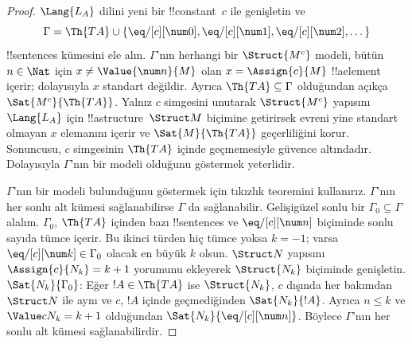 \documentclass[../../../include/open-logic-section]{subfiles}
\begin{document}
\begin{proof}
$\Lang{L_A}$ dilini yeni bir !!{constant}~$c$ ile genişletin ve
\[
\Gamma=\Th{TA}\cup\{\eq/[c][\num0],\eq/[c][\num1],
\eq/[c][\num2],\dots\}
\]
!!{sentence}s kümesini ele alın. $\Gamma$'nın herhangi bir
$\Struct{M^c}$ modeli, bütün $n\in\Nat$ için
$x\neq\Value{\num n}{M}$ olan $x=\Assign{c}{M}$ !!a{element}
içerir; dolayısıyla $x$ standart değildir. Ayrıca
$\Th{TA}\subseteq\Gamma$ olduğundan açıkça
$\Sat{M^c}{\Th{TA}}$. Yalnız $c$ simgesini unutarak $\Struct{M^c}$
yapısını $\Lang{L_A}$ için !!a{structure}~$\Struct M$ biçimine
getirirsek evreni yine standart olmayan $x$ elemanını içerir ve
$\Sat{M}{\Th{TA}}$ geçerliliğini korur. Sonuncusu, $c$ simgesinin
$\Th{TA}$ içinde geçmemesiyle güvence altındadır. Dolayısıyla
$\Gamma$'nın bir modeli olduğunu göstermek yeterlidir.

$\Gamma$'nın bir modeli bulunduğunu göstermek için tıkızlık teoremini
kullanırız. $\Gamma$'nın her sonlu alt kümesi sağlanabilirse $\Gamma$
da sağlanabilir. Gelişigüzel sonlu bir $\Gamma_0\subseteq\Gamma$
alalım. $\Gamma_0$, $\Th{TA}$ içinden bazı !!{sentence}s ve
$\eq/[c][\num n]$ biçiminde sonlu sayıda tümce içerir. Bu ikinci türden
hiç tümce yoksa $k=-1$; varsa
$\eq/[c][\num k]\in\Gamma_0$ olacak en büyük $k$ olsun.
$\Struct N$ yapısını $\Assign{c}{N_k}=k+1$ yorumunu ekleyerek
$\Struct{N_k}$ biçiminde genişletin. $\Sat{N_k}{\Gamma_0}$: Eğer
$!A\in\Th{TA}$ ise $\Struct{N_k}$, $c$ dışında her bakımdan
$\Struct N$ ile aynı ve $c$, $!A$ içinde geçmediğinden
$\Sat{N_k}{!A}$. Ayrıca $n\leq k$ ve
$\Value c{N_k}=k+1$ olduğundan
$\Sat{N_k}{\eq/[c][\num n]}$. Böylece $\Gamma$'nın her sonlu alt
kümesi sağlanabilirdir.
\end{proof}
\end{document}
